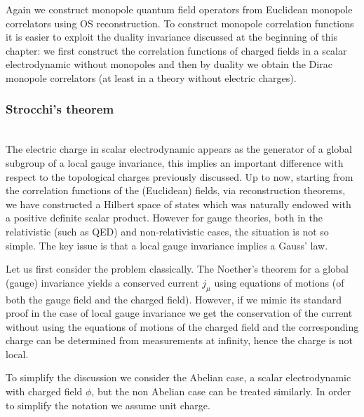 \documentclass[../main/main.tex]{subfiles}
\begin{document}
Again we construct monopole quantum field operators from Euclidean monopole correlators using OS reconstruction. To construct monopole correlation functions it is easier to exploit the duality invariance discussed at the beginning of this chapter: we first construct the correlation functions of charged fields in a scalar electrodynamic without monopoles and then by duality we obtain the Dirac monopole correlators (at least in a theory without electric charges). 

\subsubsection{Strocchi's theorem}

\cite[Chapter 7]{Strocchi_2013}\\

The electric charge in scalar electrodynamic appears as the generator of a global subgroup of a local gauge invariance, this implies an important difference with respect to the topological charges previously discussed. 
Up to now, starting from the correlation functions of the (Euclidean) fields, via reconstruction theorems, we have constructed a Hilbert space of states which was naturally endowed with a positive definite scalar product. 
However for gauge theories, both in the relativistic (such as QED) and non-relativistic cases, the situation is not so simple. The key issue is that a local gauge invariance implies a Gauss' law. 

Let us first consider the problem classically. The Noether's theorem for a global (gauge) invariance yields a conserved current $j_\mu$ using equations of motions (of both the gauge field and the charged field). However, if we mimic its standard proof in the case of local gauge invariance we get the conservation of the current without using the equations of motions of the charged field and the corresponding charge can be determined from measurements at infinity, hence the charge is not local. 

\skipline

To simplify the discussion we consider the Abelian case, a scalar electrodynamic with charged field $\phi$, but the non Abelian case can be treated similarly. In order to simplify the notation we assume unit charge. 
\end{document}
